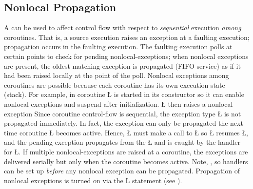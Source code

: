 \documentclass[openright,twoside]{report}
\begin{document}
\subsection{Nonlocal Propagation}

A  can be used to affect control flow with respect to \emph{sequential} execution \emph{among} coroutines.
That is, a source execution raises an exception at a faulting execution;
propagation occurs in the faulting execution.
The faulting execution polls at certain points to check for pending nonlocal-exceptions;
when nonlocal exceptions are present, the oldest matching exception is propagated (FIFO service) as if it had been raised locally at the point of the poll.
Nonlocal exceptions among coroutines are possible because each coroutine has its own execution-state (stack).
For example, in  coroutine \LGinlinetrue\LGbegin\lgrinde\L{}\endlgrinde\LGend{} is started in its constructor so it can enable nonlocal exceptions and suspend after initialization.
\LGinlinetrue\LGbegin\lgrinde\L{}\endlgrinde\LGend{} then raises a nonlocal exception %
Since coroutine control-flow is sequential, the exception type \LGinlinetrue\LGbegin\lgrinde\L{}\endlgrinde\LGend{} is not propagated immediately.
In fact, the exception can only be propagated the next time coroutine \LGinlinetrue\LGbegin\lgrinde\L{}\endlgrinde\LGend{} becomes active.
Hence, \LGinlinetrue\LGbegin\lgrinde\L{}\endlgrinde\LGend{} must make a call to \LGinlinetrue\LGbegin\lgrinde\L{}\endlgrinde\LGend{} so \LGinlinetrue\LGbegin\lgrinde\L{}\endlgrinde\LGend{} resumes \LGinlinetrue\LGbegin\lgrinde\L{}\endlgrinde\LGend{}, and the pending exception propagates from the \LGinlinetrue\LGbegin\lgrinde\L{}\endlgrinde\LGend{} and is caught by the handler for \LGinlinetrue\LGbegin\lgrinde\L{}\endlgrinde\LGend{}.
If multiple nonlocal-exceptions are raised at a coroutine, the exceptions are delivered serially but only when the coroutine becomes active.
Note, , so handlers can be set up \emph{before} any nonlocal exception can be propagated.
Propagation of nonlocal exceptions is turned on via the \LGinlinetrue\LGbegin\lgrinde\L{}\endlgrinde\LGend{} statement (see ).
\end{document}
